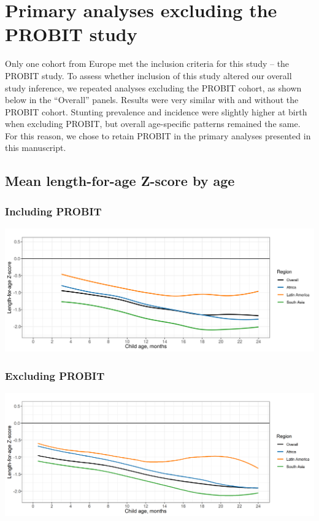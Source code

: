 \documentclass[
  9pt,
]{book}
\begin{document}
\hypertarget{exclude-PROBIT}{%
\chapter{Primary analyses excluding the PROBIT study}\label{exclude-PROBIT}}

\raggedright

Only one cohort from Europe met the inclusion criteria for this study -- the PROBIT study. To assess whether inclusion of this study altered our overall study inference, we repeated analyses excluding the PROBIT cohort, as shown below in the ``Overall'' panels. Results were very similar with and without the PROBIT cohort. Stunting prevalence and incidence were slightly higher at birth when excluding PROBIT, but overall age-specific patterns remained the same. For this reason, we chose to retain PROBIT in the primary analyses presented in this manuscript.

\hypertarget{mean-length-for-age-z-score-by-age-1}{%
\section{Mean length-for-age Z-score by age}\label{mean-length-for-age-z-score-by-age-1}}

\hypertarget{including-probit}{%
\subsection{Including PROBIT}\label{including-probit}}

\includegraphics[width=41.67in]{figures//stunting/fig-laz-2-mean-overall_region--allage-primary}

\hypertarget{excluding-probit}{%
\subsection{Excluding PROBIT}\label{excluding-probit}}

\includegraphics[width=41.67in]{figures//stunting/fig-laz-2-mean-overall_region--allage-primary_no_probit}
\end{document}
